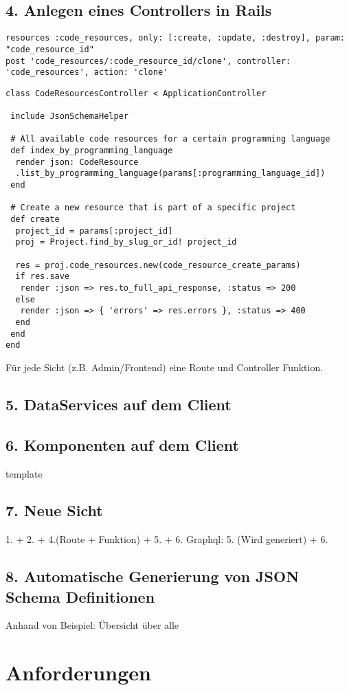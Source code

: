\subsection{4. Anlegen eines Controllers in Rails}
\begin{lstlisting}
resources :code_resources, only: [:create, :update, :destroy], param: "code_resource_id"
post 'code_resources/:code_resource_id/clone', controller:  'code_resources', action: 'clone'
\end{lstlisting}
\begin{lstlisting}
class CodeResourcesController < ApplicationController

 include JsonSchemaHelper

 # All available code resources for a certain programming language
 def index_by_programming_language
  render json: CodeResource
  .list_by_programming_language(params[:programming_language_id])
 end

 # Create a new resource that is part of a specific project
 def create
  project_id = params[:project_id]
  proj = Project.find_by_slug_or_id! project_id

  res = proj.code_resources.new(code_resource_create_params)
  if res.save
   render :json => res.to_full_api_response, :status => 200
  else
   render :json => { 'errors' => res.errors }, :status => 400
  end
 end
end
 \end{lstlisting}
Für jede Sicht (z.B. Admin/Frontend) eine Route und Controller Funktion.
\subsection{5. DataServices auf dem Client}
\subsection{6. Komponenten auf dem Client}
template
\subsection{7. Neue Sicht}
1. + 2. + 4.(Route + Funktion) + 5. + 6.
Graphql: 5. (Wird generiert) + 6.
\subsection{8. Automatische Generierung von JSON Schema Definitionen}
Anhand von Beispiel: Übersicht über alle

\section{Anforderungen}

